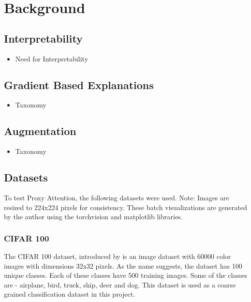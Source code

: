 \chapter{Background}
\section{Interpretability}
\begin{itemize}
	\item Need for Interpretability
\end{itemize}
\section{Gradient Based Explanations}
\begin{itemize}
	\item Taxonomy
\end{itemize}
\section{Augmentation}
\begin{itemize}
	\item Taxonomy
\end{itemize}
\section{Datasets}
To test Proxy Attention, the following datasets were used.
Note: Images are resized to 224x224 pixels for consistency. These batch visualizations are generated by the author using the torchvision and matplotlib libraries.

\subsection{CIFAR 100}
The CIFAR 100 dataset, introduced by \cite{krizhevskyLearningMultipleLayers} is an image dataset with 60000 color images with dimensions 32x32 pixels. As the name suggests, the dataset has 100 unique classes. Each of these classes have 500 training images. Some of the classes are - airplane, bird, truck, ship, deer and dog. This dataset is used as a coarse grained classification dataset in this project.



